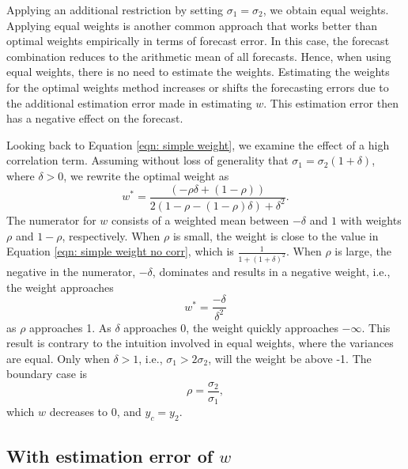 \documentclass[11pt]{article}
\begin{document}
	Applying an additional restriction by setting $\sigma_1=\sigma_2$, we obtain equal weights. Applying equal weights is another common approach that works better than optimal weights empirically \citep{Clemen1989} in terms of forecast error. In this case, the forecast combination reduces to the
	arithmetic mean of all forecasts. Hence, when using equal weights, there is no need to estimate the weights.
	Estimating the weights for the optimal weights method increases or shifts the forecasting errors due to the
	additional estimation error made in estimating \(w\). This estimation error then has a negative effect on the forecast. 
	
	Looking back to Equation \ref{eqn: simple weight}, we examine the effect
	of a high correlation term. Assuming without loss of generality that
	\(\sigma_1 =\sigma_2 (1 + \delta)\), where \(\delta>0\), we rewrite the optimal
	weight as
	\begin{equation}
	\label{eqn: w high corr}
	w^* = \frac{(-\rho\delta+ (1-\rho))}{2(1-\rho - (1-\rho)\delta)+\delta^2}.
	\end{equation}
	The numerator for \(w\) consists of a weighted
	mean between $-\delta$ and $1$ with weights \(\rho\) and $1-\rho$, respectively. When \(\rho\)
	is small, the weight is close to the value in Equation
	\ref{eqn: simple weight no corr}, which is $\frac{1}{1+(1+\delta)^2}$. When \(\rho\) is large, the negative in the numerator, \(-\delta\), dominates and results in a negative
	weight, i.e.,  the weight approaches
	\begin{equation}
	\label{eqn: w simple rho 1}
	w^* = \frac{-\delta}{\delta^2}
	\end{equation}
	as $\rho$ approaches 1. As $\delta$ approaches 0, the weight quickly approaches $-\infty$. This result is contrary to the intuition involved in equal weights, where the variances are equal.
	Only when $\delta >1$, i.e., $\sigma_1 > 2\sigma_2$, will the weight be above -1.
	The boundary case is
	\begin{equation}
	\label{eqn: corr boundary}
	\rho = \frac{\sigma_2}{\sigma_1},
	\end{equation}
	which \(w\) decreases to \(0\), and \(y_c = y_2\).
	
	\subsection{\texorpdfstring{With estimation error of
			\(w\)}{Including the estimation error for w}}\label{including-the-estimation-error-of-w}
	
\end{document}
